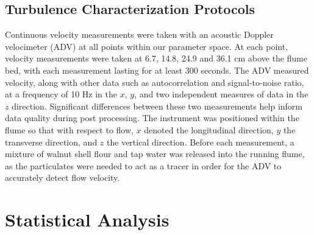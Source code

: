 \documentclass{scrreprt}
\begin{document}

\subsection{Turbulence Characterization Protocols}
Continuous velocity measurements were taken with an acoustic Doppler velocimeter (ADV) at all points within our parameter space. At each point, velocity measurements were taken at 6.7, 14.8, 24.9 and 36.1 cm above the flume bed, with each measurement lasting for at least 300 seconds. The ADV measured velocity, along with other data such as autocorrelation and signal-to-noise ratio, at a frequency of 10 Hz in the $x$, $y$, and two independent measures of data in the $z$ direction. Significant differences between these two measurements help inform data quality during post processing. The instrument was positioned within the flume so that with respect to flow, $x$ denoted the longitudinal direction, $y$ the transverse direction, and $z$ the vertical direction. Before each measurement, a mixture of walnut shell flour and tap water was released into the running flume, as the particulates were needed to act as a tracer in order for the ADV to accurately detect flow velocity.

\section{Statistical Analysis}
\end{document}
